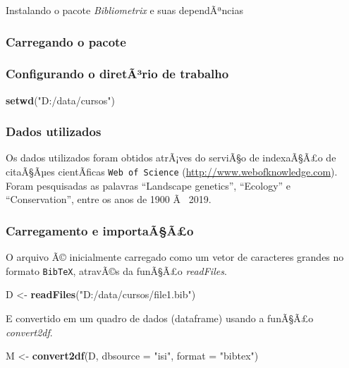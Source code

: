 \documentclass[]{article}
\newenvironment{Shaded}{\begin{snugshade}}{\end{snugshade}}
\newcommand{\KeywordTok}[1]{\textcolor[rgb]{0.13,0.29,0.53}{\textbf{#1}}}
\newcommand{\DataTypeTok}[1]{\textcolor[rgb]{0.13,0.29,0.53}{#1}}
\newcommand{\StringTok}[1]{\textcolor[rgb]{0.31,0.60,0.02}{#1}}
\newcommand{\NormalTok}[1]{#1}
\begin{document}
Instalando o pacote \emph{Bibliometrix} e suas dependÃªncias

\subsubsection{Carregando o pacote}\label{carregando-o-pacote}

\subsubsection{Configurando o diretÃ³rio de
trabalho}\label{configurando-o-diretario-de-trabalho}

\begin{Shaded}
\begin{Highlighting}[]
\KeywordTok{setwd}\NormalTok{(}\StringTok{"D:/data/cursos"}\NormalTok{)}
\end{Highlighting}
\end{Shaded}

\subsubsection{Dados utilizados}\label{dados-utilizados}

Os dados utilizados foram obtidos atrÃ¡ves do serviÃ§o de indexaÃ§Ã£o de
citaÃ§Ãµes cientÃ­ficas \texttt{Web\ of\ Science}
(\url{http://www.webofknowledge.com}). Foram pesquisadas as palavras
``Landscape genetics'', ``Ecology'' e ``Conservation'', entre os anos de
1900 Ã~ 2019.

\subsubsection{Carregamento e
importaÃ§Ã£o}\label{carregamento-e-importaaao}

O arquivo Ã© inicialmente carregado como um vetor de caracteres grandes
no formato \texttt{BibTeX}, atravÃ©s da funÃ§Ã£o \emph{readFiles}.

\begin{Shaded}
\begin{Highlighting}[]
\NormalTok{D <-}\StringTok{ }\KeywordTok{readFiles}\NormalTok{(}\StringTok{"D:/data/cursos/file1.bib"}\NormalTok{)}
\end{Highlighting}
\end{Shaded}

E convertido em um quadro de dados (dataframe) usando a funÃ§Ã£o
\emph{convert2df}.

\begin{Shaded}
\begin{Highlighting}[]
\NormalTok{M <-}\StringTok{ }\KeywordTok{convert2df}\NormalTok{(D, }\DataTypeTok{dbsource =} \StringTok{"isi"}\NormalTok{, }\DataTypeTok{format =} \StringTok{"bibtex"}\NormalTok{)}
\end{Highlighting}
\end{Shaded}
\end{document}
